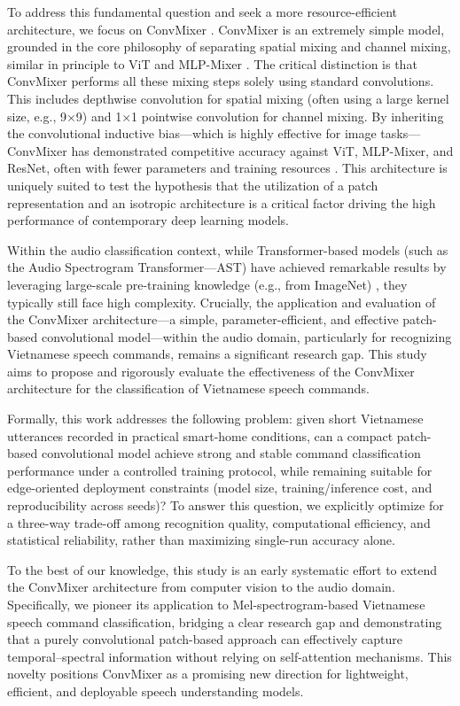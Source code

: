 To address this fundamental question and seek a more resource-efficient architecture, we focus on ConvMixer \cite{trockman2022patchesneed}.
ConvMixer is an extremely simple model, grounded in the core philosophy of separating spatial mixing and channel mixing, similar in principle to ViT \cite{dosovitskiy2020image} and MLP-Mixer \cite{Tolstikhin2021MLPMixer}.
The critical distinction is that ConvMixer performs all these mixing steps solely using standard convolutions.
This includes depthwise convolution for spatial mixing (often using a large kernel size, e.g., 9×9) and 1×1 pointwise convolution for channel mixing.
By inheriting the convolutional inductive bias—which is highly effective for image tasks—ConvMixer has demonstrated competitive accuracy against ViT, MLP-Mixer, and ResNet, often with fewer parameters and training resources \cite{trockman2022patchesneed}.
This architecture is uniquely suited to test the hypothesis that the utilization of a patch representation and an isotropic architecture is a critical factor driving the high performance of contemporary deep learning models.

Within the audio classification context, while Transformer-based models (such as the Audio Spectrogram Transformer—AST) have achieved remarkable results by leveraging large-scale pre-training knowledge (e.g., from ImageNet) \cite{Gong2021AST, Deng2009ImageNet}, they typically still face high complexity.
Crucially, the application and evaluation of the ConvMixer architecture—a simple, parameter-efficient, and effective patch-based convolutional model—within the audio domain, particularly for recognizing Vietnamese speech commands, remains a significant research gap.
This study aims to propose and rigorously evaluate the effectiveness of the ConvMixer architecture for the classification of Vietnamese speech commands.

Formally, this work addresses the following problem: given short Vietnamese utterances recorded in practical smart-home conditions, can a compact patch-based convolutional model achieve strong and stable command classification performance under a controlled training protocol, while remaining suitable for edge-oriented deployment constraints (model size, training/inference cost, and reproducibility across seeds)?
To answer this question, we explicitly optimize for a three-way trade-off among recognition quality, computational efficiency, and statistical reliability, rather than maximizing single-run accuracy alone.

To the best of our knowledge, this study is an early systematic effort to extend the ConvMixer architecture from computer vision to the audio domain.
Specifically, we pioneer its application to Mel-spectrogram-based Vietnamese speech command classification,
bridging a clear research gap and demonstrating that a purely convolutional patch-based approach can effectively capture temporal–spectral information without relying on self-attention mechanisms.
This novelty positions ConvMixer as a promising new direction for lightweight, efficient, and deployable speech understanding models.

